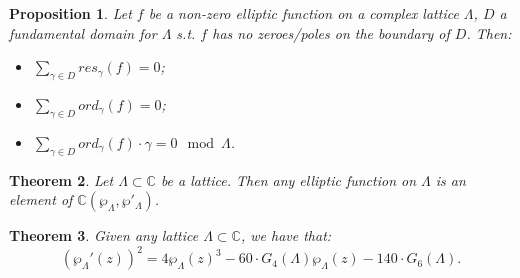 \documentclass{article}
\newcommand{\numberset}{\mathbb}
\newcommand{\C}{\numberset{C}}
\theoremstyle{plain}
\newtheorem{thm}{Theorem}
\newtheorem{prop}[thm]{Proposition}
\theoremstyle{definition}
\begin{document}
\begin{prop}
    Let $f$ be a non-zero elliptic function on a complex lattice $\Lambda$, $D$
    a fundamental domain for $\Lambda$ s.t. $f$ has no zeroes/poles on the
    boundary of $D$. Then:
    \begin{itemize}
        \item $\sum_{\gamma\in D} res_{\gamma}(f)=0$;
        \item $\sum_{\gamma\in D} ord_\gamma(f)=0$;
        \item $\sum_{\gamma\in D}ord_\gamma(f)\cdot\gamma=0\mod\Lambda$.
    \end{itemize}
\end{prop}

\begin{thm}
    Let $\Lambda\subset\C$ be a lattice. Then any elliptic function on $\Lambda$
    is an element of $\C(\wp_\Lambda,\wp'_\Lambda)$.
\end{thm}

\begin{thm}
    Given any lattice $\Lambda\subset\C$, we have that:
    $$(\wp_\Lambda'(z))^2=4\wp_\Lambda(z)^3-60\cdot
    G_4(\Lambda)\wp_\Lambda(z)-140\cdot G_6(\Lambda).$$
\end{thm}

\printbibliography
\end{document}
